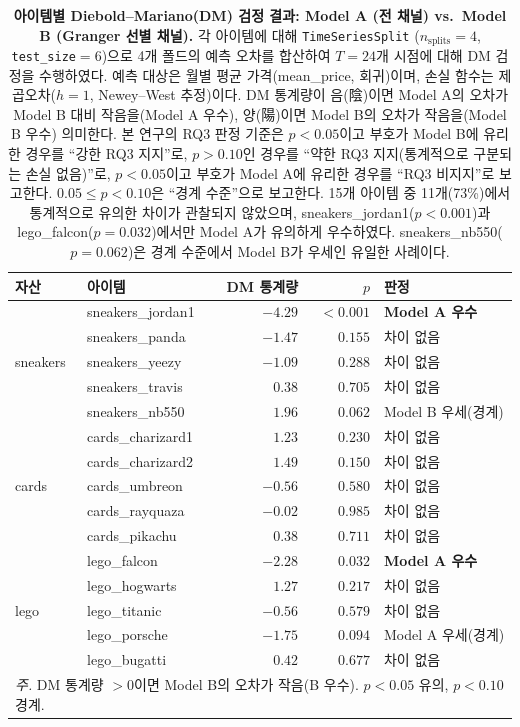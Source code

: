 \documentclass[11pt, a4paper, twocolumn]{article}
\begin{document}
\begin{table}[!tbp]
\centering\small
\caption[Diebold--Mariano 검정 결과]{\textbf{아이템별
Diebold--Mariano(DM) 검정 결과: Model A (전 채널) vs.\ Model B
(Granger 선별 채널).} 각 아이템에 대해 \texttt{TimeSeriesSplit}
($n_{\text{splits}}=4$, \texttt{test\_size}$=6$)으로 4개 폴드의 예측
오차를 합산하여 $T=24$개 시점에 대해 DM 검정을 수행하였다. 예측
대상은 월별 평균 가격(\textsf{mean\_price}, 회귀)이며, 손실 함수는
제곱오차($h=1$, Newey--West 추정)이다. DM 통계량이 음(陰)이면 Model A의
오차가 Model B 대비 작음을(Model A 우수), 양(陽)이면 Model B의 오차가
작음을(Model B 우수) 의미한다. 본 연구의 RQ3 판정 기준은 $p<0.05$이고
부호가 Model B에 유리한 경우를 ``강한 RQ3 지지''로, $p>0.10$인 경우를
``약한 RQ3 지지(통계적으로 구분되는 손실 없음)''로, $p<0.05$이고 부호가
Model A에 유리한 경우를 ``RQ3 비지지''로 보고한다. $0.05\leq p<0.10$은
``경계 수준''으로 보고한다. 15개 아이템 중 11개(73\%)에서 통계적으로
유의한 차이가 관찰되지 않았으며, sneakers\_jordan1($p<0.001$)과
lego\_falcon($p=0.032$)에서만 Model A가 유의하게 우수하였다.
sneakers\_nb550($p=0.062$)은 경계 수준에서 Model B가 우세인 유일한
사례이다.}
\label{tab:dm}
\begin{tabular}{llrrl}
\toprule
자산 & 아이템 & DM 통계량 & $p$ & 판정 \\
\midrule
\multirow{5}{*}{sneakers}
 & sneakers\_jordan1 & $-4.29$ & $<0.001$ & \textbf{Model A 우수} \\
 & sneakers\_panda   & $-1.47$ & $0.155$  & 차이 없음 \\
 & sneakers\_yeezy   & $-1.09$ & $0.288$  & 차이 없음 \\
 & sneakers\_travis  & $\phantom{-}0.38$ & $0.705$ & 차이 없음 \\
 & sneakers\_nb550   & $\phantom{-}1.96$ & $0.062$ & Model B 우세(경계) \\
\midrule
\multirow{5}{*}{cards}
 & cards\_charizard1 & $\phantom{-}1.23$ & $0.230$ & 차이 없음 \\
 & cards\_charizard2 & $\phantom{-}1.49$ & $0.150$ & 차이 없음 \\
 & cards\_umbreon    & $-0.56$ & $0.580$  & 차이 없음 \\
 & cards\_rayquaza   & $-0.02$ & $0.985$  & 차이 없음 \\
 & cards\_pikachu    & $\phantom{-}0.38$ & $0.711$ & 차이 없음 \\
\midrule
\multirow{5}{*}{lego}
 & lego\_falcon      & $-2.28$ & $0.032$  & \textbf{Model A 우수} \\
 & lego\_hogwarts    & $\phantom{-}1.27$ & $0.217$ & 차이 없음 \\
 & lego\_titanic     & $-0.56$ & $0.579$  & 차이 없음 \\
 & lego\_porsche     & $-1.75$ & $0.094$  & Model A 우세(경계) \\
 & lego\_bugatti     & $\phantom{-}0.42$ & $0.677$ & 차이 없음 \\
\midrule
\multicolumn{5}{l}{\textit{주.} DM 통계량 $> 0$이면 Model B의 오차가 작음(B 우수).
  $p < 0.05$ 유의, $p < 0.10$ 경계.}
\end{tabular}
\end{table}
\end{document}
